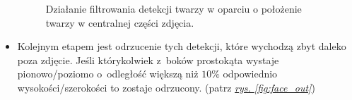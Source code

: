 \begin{itemize}
\begin{figure}[!h]
\begin{center}
        \end{center}
        \caption{Działanie filtrowania detekcji twarzy w oparciu o położenie twarzy w centralnej części zdjęcia.}
        \label{fig:face_boundary}
    \end{figure}
    
    \item Kolejnym etapem jest odrzucenie tych detekcji, które wychodzą zbyt daleko poza zdjęcie. Jeśli którykolwiek z~boków prostokąta wystaje pionowo/poziomo o~odległość większą niż $10\%$ odpowiednio wysokości/szerokości to zostaje odrzucony. (patrz \hyperref[{fig:face_out}]{\textit{rys. \ref{fig:face_out}}})
    

\end{itemize}
